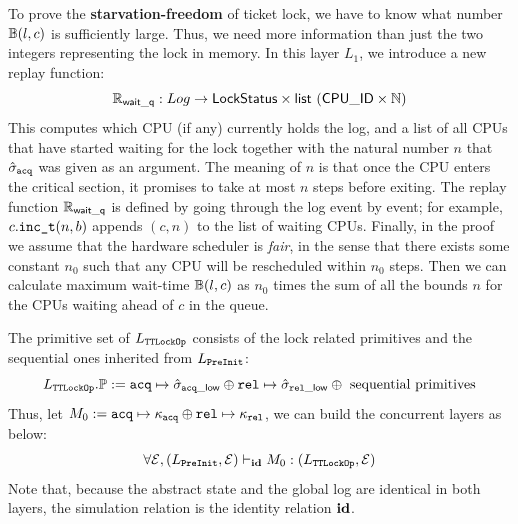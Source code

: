 {To prove the \textbf{starvation-freedom} of ticket lock,
we have to know what number $\mathbb{B}(l,c)$ is sufficiently large.
Thus,  we need more information than just the two integers representing the lock
in memory. In this layer $L_1$, we introduce
a new  replay function:
\[
\mathbb{R}_{\mathsf{wait\_q}} : Log \to  \mathsf{LockStatus} \times
 \mathsf{list}\ (\mathsf{CPU\_ID}\times\mathbb{N})
\]%
\noindent{}This computes which CPU (if any) currently holds the log, and  a list of all CPUs that have started waiting for
the lock together with the natural number $n$ that
$\hat{\sigma}_{{\texttt{acq}}}$ was given as an argument. The meaning of
$n$ is that once the CPU enters the critical section, it promises to take  at most $n$ steps before exiting. 
The replay function $\mathbb{R}_{\mathsf{wait\_q}}$ is defined by going through the log
event by event; for example, $c.{\texttt{inc\_t}}(n,b)$ appends $(c,n)$ to the list
of waiting CPUs.
Finally, in the proof we assume that the hardware scheduler is \emph{fair}, in the sense that there exists some 
constant $n_0$ such that any CPU will be rescheduled within $n_0$ steps. 
Then we can calculate maximum wait-time $\mathbb{B}(l, c)$ as $n_0$ times the sum of all the bounds $n$ for the CPUs waiting ahead of $c$ in the queue.


The primitive set of $L_{\texttt{TTLockOp}}$ consists of the lock related
primitives and the sequential ones inherited from $L_{\texttt{PreInit}}$:
\[L_{\texttt{TTLockOp}}.\mathbb{P} := {\texttt{acq}} \mapsto \hat{\sigma}_{{\texttt{acq}}\_\mathsf{low}}
\oplus {\texttt{rel}} \mapsto \hat{\sigma}_{{\texttt{rel}}\_\mathsf{low}}
\oplus \text{ sequential primitives}\]
Thus, let $M_0 := {\texttt{acq}} \mapsto \kappa_{{\texttt{acq}}}
\oplus {\texttt{rel}} \mapsto \kappa_{{\texttt{rel}}}$,
we can build the concurrent layers as below:
\[
\forall \mathcal{E}, 
(L_{\texttt{PreInit}}, \mathcal{E}) \vdash_{\textbf{id}} M_0 : (L_{\texttt{TTLockOp}}, \mathcal{E})
\]%
Note that,
because the abstract state and the global log are identical
in both layers, the simulation relation is the identity relation $\textbf{id}$.

}
